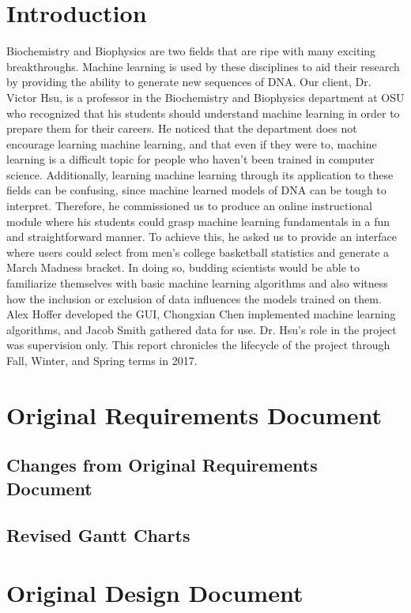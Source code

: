 \documentclass[onecolumn, draftclsnofoot,10pt, compsoc]{IEEEtran}
\begin{document}
\section{Introduction}
Biochemistry and Biophysics are two fields that are ripe with many exciting breakthroughs. Machine learning is used by these disciplines to aid their research by providing the ability to generate new sequences of DNA. Our client, Dr. Victor Hsu, is a professor in the Biochemistry and Biophysics department at OSU who recognized that his students should understand machine learning in order to prepare them for their careers. He noticed that the department does not encourage learning machine learning, and that even if they were to, machine learning is a difficult topic for people who haven't been trained in computer science. Additionally, learning machine learning through its application to these fields can be confusing, since machine learned models of DNA can be tough to interpret. Therefore, he commissioned us to produce an online instructional module where his students could grasp machine learning fundamentals in a fun and straightforward manner. To achieve this, he asked us to provide an interface where users could select from men's college basketball statistics and generate a March Madness bracket. In doing so, budding scientists would be able to familiarize themselves with basic machine learning algorithms and also witness how the inclusion or exclusion of data influences the models trained on them. Alex Hoffer developed the GUI, Chongxian Chen implemented machine learning algorithms, and Jacob Smith gathered data for  use. Dr. Hsu's role in the project was supervision only. This report chronicles the lifecycle of the project through Fall, Winter, and Spring terms in 2017.

\section{Original Requirements Document}

\newpage
\subsection{Changes from Original Requirements Document}
\subsection{Revised Gantt Charts}


\section{Original Design Document}

\end{document}
